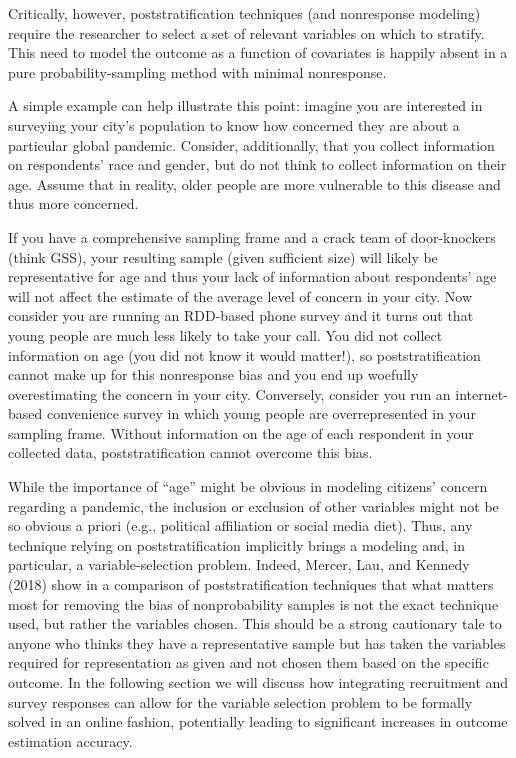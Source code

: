 \message{ !name(survey-sampling-with-ads.tex)}\documentclass[a4paper,12pt]{article}
\theoremstyle{proposition}
\begin{document}
Critically, however, poststratification techniques (and nonresponse modeling) require the researcher to select a set of relevant variables on which to stratify. This need to model the outcome as a function of covariates is happily absent in a pure probability-sampling method with minimal nonresponse.

A simple example can help illustrate this point: imagine you are interested in surveying your city’s population to know how concerned they are about a particular global pandemic. Consider, additionally, that you collect information on respondents’ race and gender, but do not think to collect information on their age. Assume that in reality, older people are more vulnerable to this disease and thus more concerned.

If you have a comprehensive sampling frame and a crack team of door-knockers (think GSS), your resulting sample (given sufficient size) will likely be representative for age and thus your lack of information about respondents’ age will not affect the estimate of the average level of concern in your city. Now consider you are running an RDD-based phone survey and it turns out that young people are much less likely to take your call. You did not collect information on age (you did not know it would matter!), so poststratification cannot make up for this nonresponse bias and you end up woefully overestimating the concern in your city. Conversely, consider you run an internet-based convenience survey in which young people are overrepresented in your sampling frame. Without information on the age of each respondent in your collected data, poststratification cannot overcome this bias.

While the importance of “age” might be obvious in modeling citizens’ concern regarding a pandemic, the inclusion or exclusion of other variables might not be so obvious a priori (e.g., political affiliation or social media diet). Thus, any technique relying on poststratification implicitly brings a modeling and, in particular, a variable-selection problem. Indeed, Mercer, Lau, and Kennedy (2018) show in a comparison of poststratification techniques that what matters most for removing the bias of nonprobability samples is not the exact technique used, but rather the variables chosen. This should be a strong cautionary tale to anyone who thinks they have a representative sample but has taken the variables required for representation as given and not chosen them based on the specific outcome. In the following section we will discuss how integrating recruitment and survey responses can allow for the variable selection problem to be formally solved in an online fashion, potentially leading to significant increases in outcome estimation accuracy.
\end{document}
